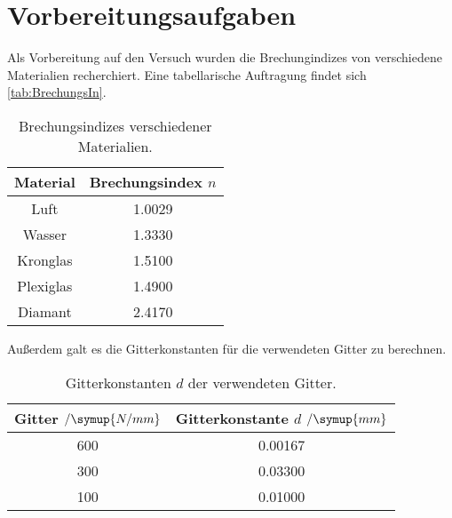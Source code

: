 \section{Vorbereitungsaufgaben}
\label{sec:Vorbereitung}
Als Vorbereitung auf den Versuch wurden die Brechungindizes von verschiedene Materialien recherchiert.
Eine tabellarische Auftragung findet sich \autoref{tab:BrechungsIn}.
\begin{table}
    \centering
    \caption{Brechungsindizes verschiedener Materialien.}
    \begin{tabular}{c c}
        \toprule
        Material & Brechungsindex $n$\\
        \midrule
        Luft & 1.0029\\
        Wasser & 1.3330\\
        Kronglas & 1.5100\\
        Plexiglas & 1.4900\\
        Diamant & 2.4170\\
        \bottomrule
    \end{tabular}
    \label{tab:BrechungsIn}
\end{table}
Außerdem galt es die Gitterkonstanten für die verwendeten Gitter zu berechnen.
\begin{table}
    \centering
    \caption{Gitterkonstanten $d$ der verwendeten Gitter.}
    \begin{tabular}{c c}
        \toprule
        Gitter $\mathbin{/}\symup{N/mm}$& Gitterkonstante $d$ $\mathbin{/} \symup{mm}$\\
        \midrule
        600& 0.00167\\
        300 & 0.03300\\
        100 & 0.01000\\
        \bottomrule
    \end{tabular}
    \label{tab:BrechungsIn}
\end{table}